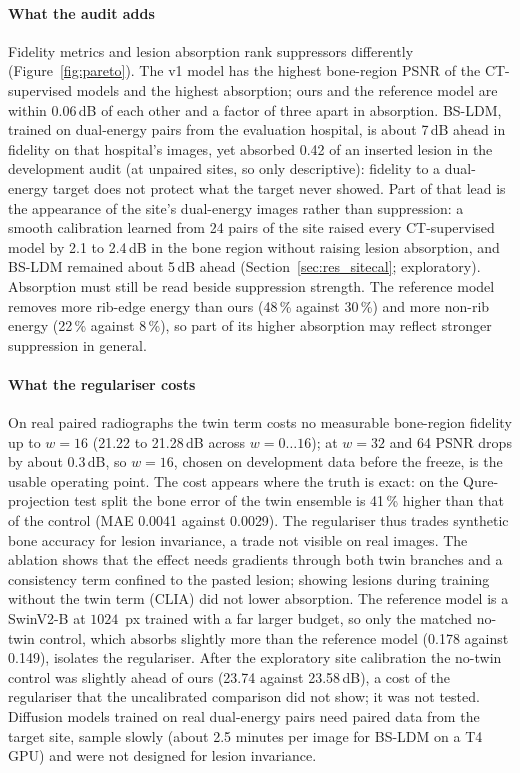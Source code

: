 \paragraph{What the audit adds} Fidelity metrics and lesion absorption rank suppressors differently (Figure~\ref{fig:pareto}). The v1 model
has the highest bone-region PSNR of the CT-supervised models and the highest absorption; ours and the reference model are within 0.06\,dB of
each other and a factor of three apart in absorption. BS-LDM, trained on dual-energy pairs from the evaluation hospital, is about 7\,dB ahead
in fidelity on that hospital's images, yet absorbed 0.42 of an inserted lesion in the development audit (at unpaired sites, so only
descriptive): fidelity to a dual-energy target does not protect what the target never showed. Part of that lead is the appearance of the
site's dual-energy images rather than suppression: a smooth calibration learned from 24 pairs of the site raised every CT-supervised model by
2.1 to 2.4\,dB in the bone region without raising lesion absorption, and BS-LDM remained about 5\,dB ahead
(Section~\ref{sec:res_sitecal}; exploratory). Absorption must still be read beside
suppression strength. The reference model removes more rib-edge energy than ours (48\,\% against 30\,\%) and more non-rib energy (22\,\%
against 8\,\%), so part of its higher absorption may reflect stronger suppression in general.

\paragraph{What the regulariser costs} On real paired radiographs the twin term costs no measurable bone-region fidelity up to $w=16$ (21.22
to 21.28\,dB across $w=0\ldots16$); at $w=32$ and 64 PSNR drops by about 0.3\,dB, so $w=16$, chosen on development data before the freeze,
is the usable operating point. The cost appears where the truth is exact: on the Qure-projection test split the bone error of the twin
ensemble is 41\,\% higher than that of the control (MAE 0.0041 against 0.0029). The regulariser thus trades synthetic bone accuracy for
lesion invariance, a trade not visible on real images. The ablation shows that the effect needs gradients through both twin branches and a
consistency term confined to the pasted lesion; showing lesions during training without the twin term (CLIA) did not lower absorption. The
reference model is a SwinV2-B at $1024$~px trained with a far larger budget, so only the matched no-twin control, which absorbs slightly more
than the reference model (0.178 against 0.149), isolates the regulariser. After the exploratory site calibration the no-twin control was
slightly ahead of ours (23.74 against 23.58\,dB), a cost of the regulariser that the uncalibrated comparison did not show; it was not
tested. Diffusion models trained on real dual-energy pairs
\citep{sun2026bsldm,sun2026debonedit} need paired data from the target site, sample slowly (about 2.5 minutes per image for BS-LDM on a T4
GPU) and were not designed for lesion invariance.


